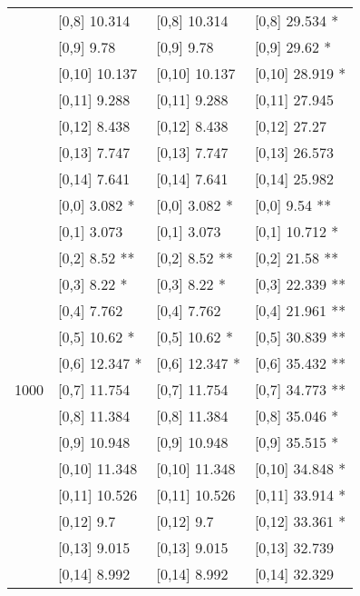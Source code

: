 \begin{table}
\begin{tabular}[t]{llll}
 & {}[0,8] 10.314 & {}[0,8] 10.314 & {}[0,8] 29.534 *\\
 & {}[0,9] 9.78 & {}[0,9] 9.78 & {}[0,9] 29.62 *\\
\addlinespace
 & {}[0,10] 10.137 & {}[0,10] 10.137 & {}[0,10] 28.919 *\\
 & {}[0,11] 9.288 & {}[0,11] 9.288 & {}[0,11] 27.945\\
 & {}[0,12] 8.438 & {}[0,12] 8.438 & {}[0,12] 27.27\\
 & {}[0,13] 7.747 & {}[0,13] 7.747 & {}[0,13] 26.573\\
 & {}[0,14] 7.641 & {}[0,14] 7.641 & {}[0,14] 25.982\\
\addlinespace
 & {}[0,0] 3.082 * & {}[0,0] 3.082 * & {}[0,0] 9.54 **\\
 & {}[0,1] 3.073 & {}[0,1] 3.073 & {}[0,1] 10.712 *\\
 & {}[0,2] 8.52 ** & {}[0,2] 8.52 ** & {}[0,2] 21.58 **\\
 & {}[0,3] 8.22 * & {}[0,3] 8.22 * & {}[0,3] 22.339 **\\
 & {}[0,4] 7.762 & {}[0,4] 7.762 & {}[0,4] 21.961 **\\
\addlinespace
 & {}[0,5] 10.62 * & {}[0,5] 10.62 * & {}[0,5] 30.839 **\\
 & {}[0,6] 12.347 * & {}[0,6] 12.347 * & {}[0,6] 35.432 **\\
1000 & {}[0,7] 11.754 & {}[0,7] 11.754 & {}[0,7] 34.773 **\\
 & {}[0,8] 11.384 & {}[0,8] 11.384 & {}[0,8] 35.046 *\\
 & {}[0,9] 10.948 & {}[0,9] 10.948 & {}[0,9] 35.515 *\\
\addlinespace
 & {}[0,10] 11.348 & {}[0,10] 11.348 & {}[0,10] 34.848 *\\
 & {}[0,11] 10.526 & {}[0,11] 10.526 & {}[0,11] 33.914 *\\
 & {}[0,12] 9.7 & {}[0,12] 9.7 & {}[0,12] 33.361 *\\
 & {}[0,13] 9.015 & {}[0,13] 9.015 & {}[0,13] 32.739\\
 & {}[0,14] 8.992 & {}[0,14] 8.992 & {}[0,14] 32.329\\
\bottomrule
\end{tabular}
\end{table}
